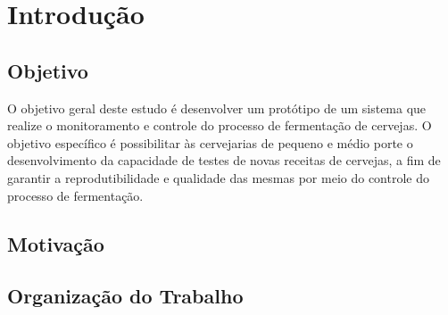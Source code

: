 \chapter{Introdução}

\section{Objetivo}

O objetivo geral deste estudo é desenvolver um protótipo de um sistema que realize o monitoramento e controle do processo de fermentação de cervejas.
O objetivo específico é possibilitar às cervejarias de pequeno e médio porte o desenvolvimento da capacidade de testes de novas receitas de cervejas, 
a fim de garantir a reprodutibilidade e qualidade das mesmas por meio do controle do processo de fermentação.

\section{Motivação}

\section{Organização do Trabalho}
